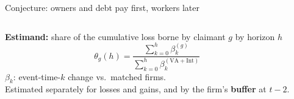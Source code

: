 \documentclass[aspectratio=169,11pt]{beamer}
\newcommand{\hl}[1]{{\color{WarmAmber}\bfseries #1}}
\begin{document}
\begin{frame}[label=conjecture]{Conjecture: owners and debt pay first, workers later}
  \begin{columns}[c,onlytextwidth]
    \begin{keybox}[fontupper=\color{DeepCharcoal}\small\raggedright]
      \textbf{Estimand:} share of the cumulative loss borne by claimant $g$ by horizon $h$
      \[
        \theta_g(h)=\frac{\sum_{k=0}^{h}\beta^{(g)}_k}{\sum_{k=0}^{h}\beta^{(\text{VA}+\text{Int})}_k}
      \]
      \footnotesize $\beta_k$: event-time-$k$ change vs.\ matched firms.\\[2pt]
      Estimated separately for losses and gains, and by the firm's \hl{buffer} at $t-2$.
    \end{keybox}


\end{columns}
\end{frame}
\end{document}
